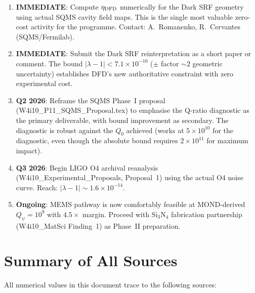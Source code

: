 \documentclass[11pt]{article}
\newcommand{\lbone}{|\lambda - 1|}
\newcommand{\Qpsi}{Q_\psi}
\newcommand{\ee}[1]{\times 10^{#1}}
\theoremstyle{definition}
\theoremstyle{remark}
\begin{document}
\begin{enumerate}
\item \textbf{IMMEDIATE}: Compute $\eta_{\rm DFD}$ numerically for
  the Dark SRF geometry using actual SQMS cavity field maps. This is
  the single most valuable zero-cost activity for the programme.
  Contact: A.~Romanenko, R.~Cervantes (SQMS/Fermilab).

\item \textbf{IMMEDIATE}: Submit the Dark SRF reinterpretation as a
  short paper or comment. The bound $\lbone < 7.1\ee{-10}$ ($\pm$
  factor $\sim 2$ geometric uncertainty) establishes DFD's new
  authoritative constraint with zero experimental cost.

\item \textbf{Q2 2026}: Reframe the SQMS Phase~I proposal
  (W4i10\_P11\_SQMS\_Proposal.tex) to emphasise the Q-ratio diagnostic
  as the primary deliverable, with bound improvement as secondary.
  The diagnostic is robust against the $Q_0$ achieved (works at
  $5\ee{10}$ for the diagnostic, even though the absolute bound
  requires $2\ee{11}$ for maximum impact).

\item \textbf{Q3 2026}: Begin LIGO O4 archival reanalysis
  (W4i10\_Experimental\_Proposals, Proposal~1) using the actual O4
  noise curve. Reach: $\lbone \sim 1.6\ee{-14}$.

\item \textbf{Ongoing}: MEMS pathway is now comfortably feasible at
  MOND-derived $\Qpsi = 10^9$ with $4.5\times$ margin. Proceed with
  Si$_3$N$_4$ fabrication partnership (W4i10\_MatSci Finding~1) as
  Phase~II preparation.
\end{enumerate}


\section{Summary of All Sources}
\label{sec:sources}

All numerical values in this document trace to the following sources:
\end{document}
